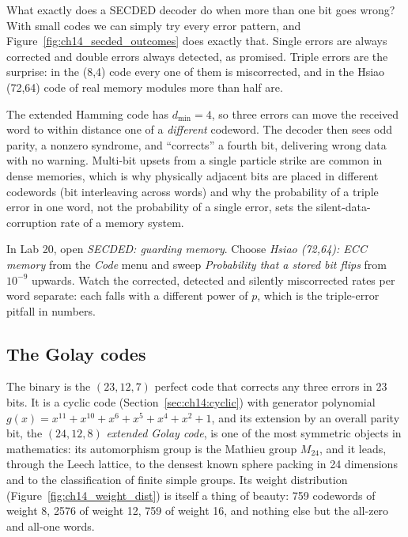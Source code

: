 What exactly does a SECDED decoder do when more than one bit goes wrong? With small codes we can
simply try every error pattern, and Figure~\ref{fig:ch14_secded_outcomes} does exactly that. Single
errors are always corrected and double errors always detected, as promised. Triple errors are the
surprise: in the (8,4) code every one of them is miscorrected, and in the Hsiao (72,64) code of real
memory modules more than half are.


\begin{pitfall}
The extended Hamming code has $d_{\min}=4$, so three errors can move the received word to within
distance one of a \emph{different} codeword. The decoder then sees odd parity, a nonzero
syndrome, and ``corrects'' a fourth bit, delivering wrong data with no warning. Multi-bit upsets
from a single particle strike are common in dense memories, which is why physically adjacent
bits are placed in different codewords (bit interleaving across words) and why the probability of
a triple error in one word, not the probability of a single error, sets the silent-data-corruption
rate of a memory system.
\end{pitfall}

\begin{tryit}
In Lab 20, open \emph{SECDED: guarding memory}. Choose \emph{Hsiao (72,64): ECC memory} from the
\emph{Code} menu and sweep \emph{Probability that a stored bit flips} from $10^{-9}$ upwards. Watch
the corrected, detected and silently miscorrected rates per word separate: each falls with a
different power of $p$, which is the triple-error pitfall in numbers.
\end{tryit}

\subsection{The Golay codes}

The binary  is the $(23,12,7)$ perfect code that corrects any three errors in 23
bits. It is a cyclic code (Section~\ref{sec:ch14:cyclic}) with generator polynomial
$g(x)=x^{11}+x^{10}+x^6+x^5+x^4+x^2+1$, and its extension by an overall parity bit, the
$(24,12,8)$ \emph{extended Golay code}, is one of the most symmetric objects in mathematics: its
automorphism group is the Mathieu group $M_{24}$, and it leads, through the Leech lattice, to the
densest known sphere packing in 24 dimensions and to the classification of finite simple groups.
Its weight distribution (Figure~\ref{fig:ch14_weight_dist}) is itself a thing of beauty: 759
codewords of weight 8, 2576 of weight 12, 759 of weight 16, and nothing else but the all-zero and
all-one words.

